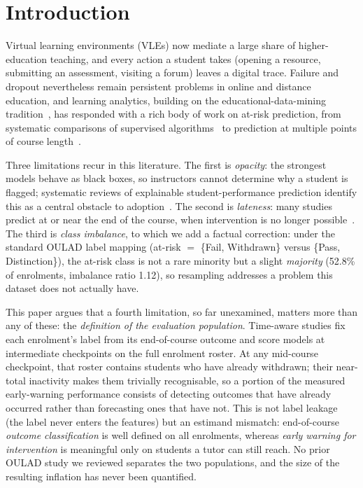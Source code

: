 \documentclass[conference]{IEEEtran}
\begin{document}
\section{Introduction}

Virtual learning environments (VLEs) now mediate a large share of
higher-education teaching, and every action a student takes (opening a
resource, submitting an assessment, visiting a forum) leaves a digital
trace. Failure and dropout nevertheless remain persistent problems in online
and distance education, and learning analytics, building on the
educational-data-mining tradition~\cite{romero2010,romero2013,baker2009},
has responded with a rich body of work on at-risk prediction, from
systematic comparisons of
supervised algorithms~\cite{tomasevic2020} to prediction at multiple points
of course length~\cite{adnan2021}.

Three limitations recur in this literature. The first is \emph{opacity}:
the strongest models behave as black boxes, so instructors cannot determine
why a student is flagged; systematic reviews of explainable
student-performance prediction identify this as a central obstacle to
adoption~\cite{alamri2021}. The second is \emph{lateness}: many studies
predict at or near the end of the course, when intervention is no longer
possible~\cite{adnan2021}. The third is \emph{class imbalance}, to which
we add a factual correction: under the standard OULAD label mapping
(at-risk $=$ \{Fail, Withdrawn\} versus \{Pass, Distinction\}), the at-risk
class is not a rare minority but a slight \emph{majority} (52.8\% of
enrolments, imbalance ratio 1.12), so resampling addresses a problem this
dataset does not actually have.

This paper argues that a fourth limitation, so far unexamined, matters more
than any of these: the \emph{definition of the evaluation population}.
Time-aware studies fix each enrolment's label from its end-of-course
outcome and score models at intermediate checkpoints on the full enrolment
roster. At any mid-course checkpoint, that roster contains students who have
already withdrawn; their near-total inactivity makes them trivially
recognisable, so a portion of the measured early-warning performance
consists of detecting outcomes that have already occurred rather than
forecasting ones that have not. This is not label leakage (the label never
enters the features) but an estimand mismatch: end-of-course
\emph{outcome classification} is well defined on all enrolments, whereas
\emph{early warning for intervention} is meaningful only on students a
tutor can still reach. No prior OULAD study we reviewed separates the two
populations, and the size of the resulting inflation has never been
quantified.
\end{document}
